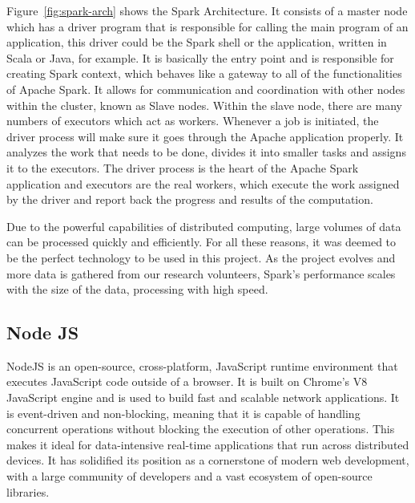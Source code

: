 Figure~\ref{fig:spark-arch} shows the Spark Architecture. It consists of a master node which has a driver program that is responsible for calling the main program of an application, this driver could be the Spark shell or the application, written in Scala or Java, for example. It is basically the entry point and is responsible for creating Spark context, which behaves like a gateway to all of the functionalities of Apache Spark. It allows for communication and coordination with other nodes within the cluster, known as Slave nodes. Within the slave node, there are many numbers of executors which act as workers. Whenever a job is initiated, the driver process will make sure it goes through the Apache application properly. It analyzes the work that needs to be done, divides it into smaller tasks and assigns it to the executors. The driver process is the heart of the Apache Spark application and executors are the real workers, which execute the work assigned by the driver and report back the progress and results of the computation.\cite{8988541}

Due to the powerful capabilities of distributed computing, large volumes of data can be processed quickly and efficiently. For all these reasons, it was deemed to be the perfect technology to be used in this project. As the project evolves and more data is gathered from our research volunteers, Spark's performance scales with the size of the data, processing with high speed.


\subsection{Node JS}
NodeJS is an open-source, cross-platform, JavaScript runtime environment that executes JavaScript code outside of a browser. It is built on Chrome's V8 JavaScript engine and is used to build fast and scalable network applications. It is event-driven and non-blocking, meaning that it is capable of handling concurrent operations without blocking the execution of other operations. This makes it ideal for data-intensive real-time applications that run across distributed devices.\cite{nodejs}
It has solidified its position as a cornerstone of modern web development, with a large community of developers and a vast ecosystem of open-source libraries.

